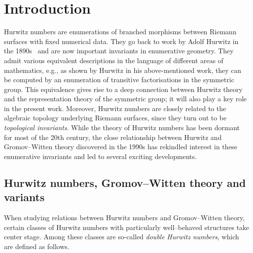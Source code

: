 \section{Introduction}

Hurwitz numbers are enumerations of branched morphisms between Riemann surfaces with fixed numerical data. They go back to work by Adolf Hurwitz in the 1890s~\cite{hurwitz1892algebraische} and are now important invariants in enumerative geometry. 
They admit various equivalent descriptions in the language of different areas of mathematics, e.g., as shown by Hurwitz in his above-mentioned work, they can be computed by an enumeration of transitive factorisations in the symmetric group. This equivalence gives rise to a deep connection between Hurwitz theory and the representation theory of the symmetric group; it will also play a key role in the present work. Moreover, Hurwitz numbers are closely related to the algebraic topology underlying Riemann surfaces, since they turn out to be \textit{topological invariants}. While the theory of Hurwitz numbers has been dormant for most of the 20th century, the close relationship between Hurwitz and Gromov--Witten theory discovered in the 1990s has rekindled interest in these enumerative invariants and led to several exciting developments.\vspace{\baselineskip}

\subsection{Hurwitz numbers, Gromov--Witten theory and variants}
When studying relations between Hurwitz numbers and Gromov--Witten theory, certain classes of Hurwitz numbers with particularly well--behaved structures take center stage. Among these classes are so-called \textit{double Hurwitz numbers}, which are defined as follows.

